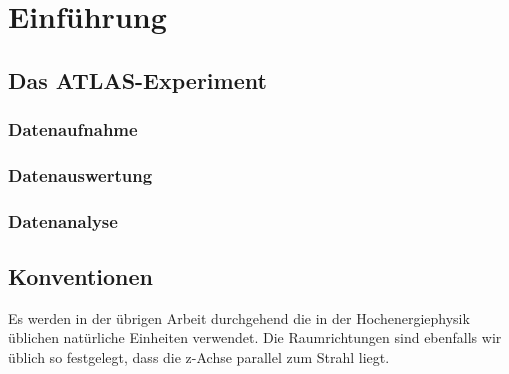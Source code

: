 \section{Einführung}
\subsection{Das ATLAS-Experiment}

\subsubsection{Datenaufnahme}
\subsubsection{Datenauswertung}
\subsubsection{Datenanalyse}

\subsection{Konventionen}
Es werden in der übrigen Arbeit durchgehend die in der Hochenergiephysik
üblichen natürliche Einheiten verwendet. Die Raumrichtungen sind ebenfalls wir
üblich so festgelegt, dass die z-Achse parallel zum Strahl liegt.
